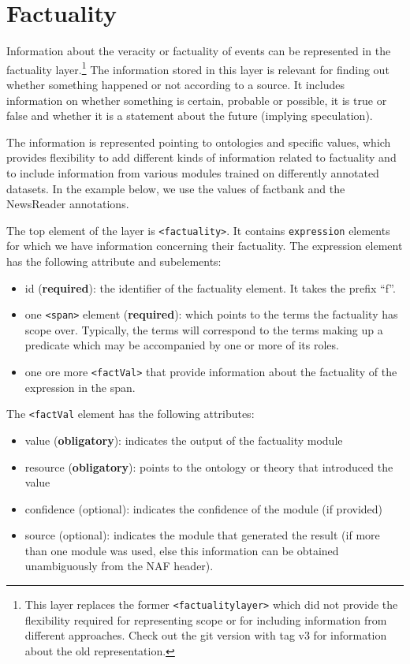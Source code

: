 \section{Factuality}
\label{sec:factuality}

Information about the veracity or factuality of events can be represented in the factuality layer.\footnote{This layer replaces the former {\tt<factualitylayer>} which did not provide the flexibility required for representing scope or for including information from different approaches. Check out the git version with tag v3 for information about the old representation.} The information stored in this layer is relevant for finding out whether something happened or not according to a source. It includes information on whether something is certain, probable or possible, it is true or false and whether it is a statement about the future (implying speculation).

The  information is represented pointing to ontologies and specific values, which provides flexibility to add different kinds of information related to factuality and to include information from various modules trained on differently annotated datasets. In the example below, we use the values of factbank and the NewsReader annotations.

The top element of the layer is {\tt <factuality>}. It contains {\tt expression} elements for which we have information concerning their factuality. The expression element has the following attribute and subelements:

\begin{itemize}
\item id (\textbf{required}): the identifier of the factuality element. It takes the prefix ``f''.
\item one {\tt <span>} element (\textbf{required}): which points to the terms the factuality has scope over. Typically, the terms will correspond to the terms making up a predicate which may be accompanied by one or more of its roles. 
\item one ore more {\tt <factVal>} that provide information about the factuality of the expression in the span.
\end{itemize}

The {\tt <factVal} element has the following attributes:

\begin{itemize}
\item value (\textbf{obligatory}): indicates the output of the factuality module
\item resource (\textbf{obligatory}): points to the ontology or theory that introduced the value
\item confidence (optional): indicates the confidence of the module (if provided)
\item source (optional): indicates the module that generated the result (if more than one module was used, else this information can be obtained unambiguously from the NAF header).
\end{itemize}


